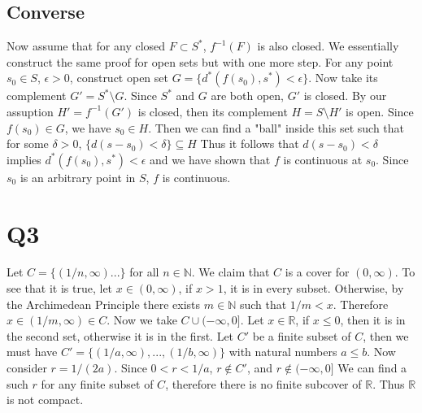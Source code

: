 \documentclass[12pt]{article}
\newcommand{\N}{\mathbb{N}}
\newcommand{\R}{\mathbb{R}}
\begin{document}
\subsection{Converse}
Now assume that for any closed $F \subset S^{*}$,  $f^{-1}(F)$ is also closed. We essentially construct the same proof for open sets but with one more step. For any point $s_0 \in S$, $\epsilon >0$,  construct open set $G = \{d^{*}(f(s_0), s^{*}) < \epsilon\}$. Now take its complement $G' = S^{*} \setminus G$. Since $S^{*}$ and $G$ are both open, $G'$ is closed.
\newline
By our assuption $H' = f^{-1}(G')$ is closed, then its complement $H = S \setminus H'$ is open. Since $f(s_0) \in G$, we have $s_0 \in H$. Then we can find a "ball" inside this set such that for some $\delta >0$, $\{d(s-s_0)<\delta\} \subseteq H$
\newline
Thus it follows that $d(s-s_0)<\delta$ implies $d^{*}(f(s_0), s^{*}) < \epsilon$ and we have shown that $f$ is continuous at $s_0$. Since $s_0$ is an arbitrary point in $S$, $f$ is continuous.
\newpage


\section{Q3}
Let $C = \{(1/n, \infty)...\}$ for all $n \in \N$.
We claim that $C$ is a cover for $(0, \infty)$. To see that it is true, let $x \in (0, \infty)$, if $x>1$, it is in every subset. Otherwise, by the Archimedean Principle there exists $m \in \N$ such that $1/m < x$. Therefore $x \in (1/m, \infty) \in C$.
\newline
Now we take $C \cup (-\infty, 0]$. Let $x \in \R$, if $ x\leq 0$, then it is in the second set, otherwise it is in the first.
\newline
Let $C'$ be a finite subset of $C$, then we must have $C' = \{(1/a, \infty), ..., (1/b, \infty)\}$ with natural numbers $a \leq b$. Now consider $r = 1/(2a)$. Since $0<r<1/a$, $r \not \in C'$, and $r \not \in (-\infty, 0]$
\newline
We can find a such $r$ for any finite subset of $C$, therefore there is no finite subcover of $\R$. Thus $\R$ is not compact.
\newpage
\end{document}
